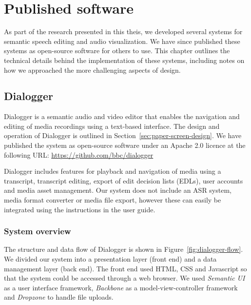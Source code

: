 \chapter{Published software}\label{app:tech}

As part of the research presented in this theis, we developed several systems for semantic speech editing and audio
visualization. We have since published these systems as open-source software for others to use. This chapter outlines
the technical details behind the implementation of these systems, including notes on how we approached the more
challenging aspects of design.

\section{Dialogger}\label{sec:dialogger}

Dialogger is a semantic audio and video editor that enables the navigation and editing of media recordings using a
text-based interface. The design and operation of Dialogger is outlined in Section~\ref{sec:paper-screen-design}. We
have published the system as open-source software under an Apache 2.0 licence at the following URL:
\url{https://github.com/bbc/dialogger}



Dialogger includes features for playback and navigation of media using a transcript, transcript editing, export of edit
decision lists (EDLs), user accounts and media asset management. Our system does not include an ASR system, media
format converter or media file export, however these can easily be integrated using the instructions in the user guide.

\subsection{System overview}

The structure and data flow of Dialogger is shown in Figure~\ref{fig:dialogger-flow}. We divided our system into a
presentation layer (front end) and a data management layer (back end). The front end used HTML, CSS and Javascript so
that the system could be accessed through a web browser.  We used \textit{Semantic UI} as a user interface framework,
\textit{Backbone} as a model-view-controller framework and \textit{Dropzone} to handle file uploads.

